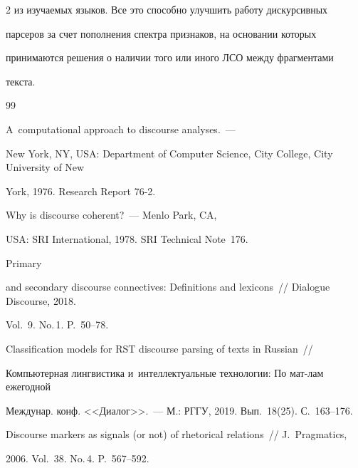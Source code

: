 \begin{multicols}{2}
из изучаемых языков. Все это способно улучшить работу дискурсивных 


парсеров за счет пополнения спектра признаков, на основании которых 


принимаются решения о наличии того или иного ЛСО между фрагментами 


текста.





{\small\frenchspacing


{%




\begin{thebibliography}{99}




 A~computational approach to discourse analyses.~--- 


New York, NY, USA: Department of Computer Science, City College, City University of New 


York, 1976.  Research Report 76-2.




 Why is discourse coherent?~--- Menlo Park, CA, 


USA: SRI International, 1978.  SRI Technical Note~176.




 Primary 


and secondary discourse connectives: Definitions and lexicons~// Dialogue Discourse, 2018. 


Vol.~9. No.\,1. P.~50--78.




 Classification models for RST discourse parsing of texts in Russian~// 


Компьютерная лингвистика и~интеллектуальные технологии: По мат-лам ежегодной 


Междунар. конф. <<Диалог>>.~--- М.: РГГУ, 2019. Вып.~18(25). С.~163--176.




 Discourse markers as signals (or not) of rhetorical relations~// J.~Pragmatics, 


2006. Vol.~38. No.\,4. P.~567--592.



\end{thebibliography}}}
\end{multicols}
